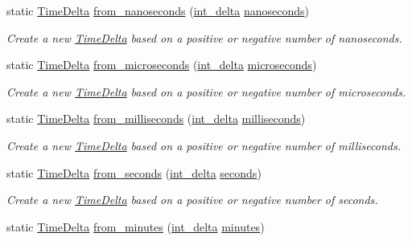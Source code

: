 \begin{DoxyCompactItemize}
\item 
static \hyperlink{structTimeDelta}{Time\-Delta} \hyperlink{structTimeDelta_abc1b517c2156b2d9627fd07d42aecb2f}{from\-\_\-nanoseconds} (\hyperlink{types_8h_a8a67cf99971c5cfeeaa2380ba84a4c92}{int\-\_\-delta} \hyperlink{structTimeDelta_a27608357ea9addd1d0da20918f91d500}{nanoseconds})
\begin{DoxyCompactList}\small\item\em Create a new \hyperlink{structTimeDelta}{Time\-Delta} based on a positive or negative number of nanoseconds. \end{DoxyCompactList}\item 
static \hyperlink{structTimeDelta}{Time\-Delta} \hyperlink{structTimeDelta_a32f3fa21ba37d81507383d001f3b704b}{from\-\_\-microseconds} (\hyperlink{types_8h_a8a67cf99971c5cfeeaa2380ba84a4c92}{int\-\_\-delta} \hyperlink{structTimeDelta_aa23b22a3b2a0f3f559e9dc343588b546}{microseconds})
\begin{DoxyCompactList}\small\item\em Create a new \hyperlink{structTimeDelta}{Time\-Delta} based on a positive or negative number of microseconds. \end{DoxyCompactList}\item 
static \hyperlink{structTimeDelta}{Time\-Delta} \hyperlink{structTimeDelta_a01e0919f444379030aa37559fa13542c}{from\-\_\-milliseconds} (\hyperlink{types_8h_a8a67cf99971c5cfeeaa2380ba84a4c92}{int\-\_\-delta} \hyperlink{structTimeDelta_a185b2278844ed43b2f5e1e8d16b11cb2}{milliseconds})
\begin{DoxyCompactList}\small\item\em Create a new \hyperlink{structTimeDelta}{Time\-Delta} based on a positive or negative number of milliseconds. \end{DoxyCompactList}\item 
static \hyperlink{structTimeDelta}{Time\-Delta} \hyperlink{structTimeDelta_aad4311d8580ade36d8c567576630c967}{from\-\_\-seconds} (\hyperlink{types_8h_a8a67cf99971c5cfeeaa2380ba84a4c92}{int\-\_\-delta} \hyperlink{structTimeDelta_aa1fe6d8a690ab04b561400c09db673ef}{seconds})
\begin{DoxyCompactList}\small\item\em Create a new \hyperlink{structTimeDelta}{Time\-Delta} based on a positive or negative number of seconds. \end{DoxyCompactList}\item 
static \hyperlink{structTimeDelta}{Time\-Delta} \hyperlink{structTimeDelta_a244bc3b143bfa760aa2b0cf350cf768c}{from\-\_\-minutes} (\hyperlink{types_8h_a8a67cf99971c5cfeeaa2380ba84a4c92}{int\-\_\-delta} \hyperlink{structTimeDelta_a2856a4e761fc83822cc6987655035e76}{minutes})

\end{DoxyCompactItemize}
